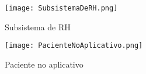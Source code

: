                     \begin{figure}[H]
              \begin{center}
                  \caption{Subsistema de RH} \label{afp}
                  \texttt{[image: SubsistemaDeRH.png]} \\

              \end{center}
             \end{figure} 

              \begin{figure}[H]
              \begin{center}
                  \caption{Paciente no aplicativo } \label{afp}
                  \texttt{[image: PacienteNoAplicativo.png]} \\
              \end{center}
             \end{figure}
     






         